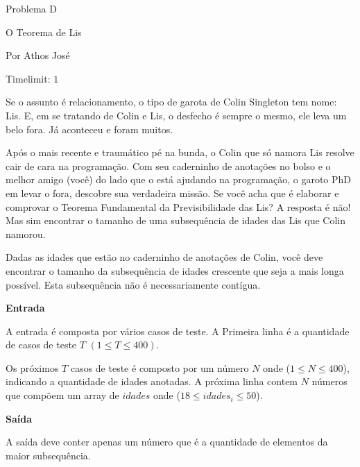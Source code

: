 \begin{center}
Problema D

O Teorema de Lis

{\tiny Por Athos José}

Timelimit: $1$	
\end{center}

Se o assunto é relacionamento, o tipo de garota de Colin Singleton tem nome: Lis. E, em se tratando de Colin e Lis, o desfecho é sempre o mesmo, ele leva um belo fora. Já aconteceu e foram muitos.

Após o mais recente e traumático pé na bunda, o Colin que só namora Lis resolve cair de cara na programação. Com seu caderninho de anotações no bolso e o melhor amigo (você) do lado que o está ajudando na programação, o garoto PhD em levar o fora, descobre sua verdadeira missão. Se você acha que é elaborar e comprovar o Teorema Fundamental da Previsibilidade das Lis? A resposta é não! Mas sim encontrar o tamanho de uma subsequência de idades das Lis que Colin namorou.

Dadas as idades que estão no caderninho de anotações de Colin, você deve encontrar o tamanho da subsequência de idades crescente que seja a mais longa possível. Esta subsequência não é necessariamente contígua.

\vspace{0.3cm}
\textbf{Entrada}

A entrada é composta por vários casos de teste. A Primeira linha é a quantidade de casos de teste $ T $ $ ( 1 \leq T \leq 400) $.

Os próximos $ T $ casos de teste é composto por um número $ N $ onde ($ 1 \leq N \leq 400 $), indicando a quantidade de idades anotadas. A próxima linha contem $ N $ números que compõem um array de $ idades $ onde ($ 18 \leq idades_i \leq 50 $).

\vspace{0.3cm}
\textbf{Saída}

A saída deve conter apenas um número que é a quantidade de elementos da maior subsequência.

